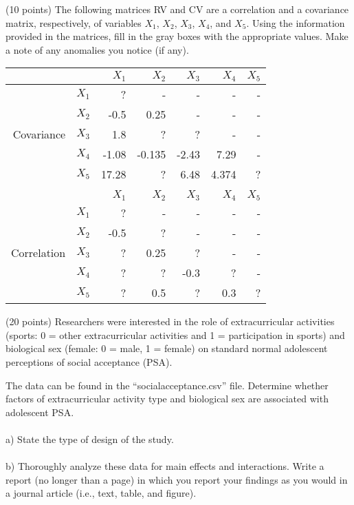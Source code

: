 \documentclass[onecolumn,10pt]{jhwhw}
\begin{document}
\problem{}
(10 points) The following matrices RV and CV are a correlation and a covariance matrix, respectively, of variables $X_1$, $X_2$, $X_3$, $X_4$, and $X_5$. Using the information provided in the matrices, fill in the gray boxes with the appropriate values. Make a note of any anomalies you notice (if any).

\begin{table}[h!]
\begin{center}
\begin{tabular}{rr|rrrrr}
\toprule
  & & $X_1$ & $X_2$ & $X_3$ & $X_4$ & $X_5$ \\
\midrule
            & $X_1$ & ?      & -       & -     & -     & -   \\
            & $X_2$ & -0.5   & 0.25    & -     & -     & -   \\
Covariance  & $X_3$ & 1.8    & ?       & ?     & -     & -   \\
            & $X_4$ & -1.08  & -0.135  & -2.43 & 7.29  & -   \\
            & $X_5$ & 17.28  & ?       &  6.48 & 4.374 & ?   \\
\bottomrule
\\
\toprule
  & & $X_1$ & $X_2$ & $X_3$ & $X_4$ & $X_5$ \\
\midrule
            & $X_1$ & ?      & -       & -     & -     & -   \\
            & $X_2$ & -0.5   & ?       & -     & -     & -   \\
Correlation & $X_3$ & ?      & 0.25    & ?     & -     & -   \\
            & $X_4$ & ?      & ?       & -0.3  & ?     & -   \\
            & $X_5$ & ?      & 0.5     & ?     & 0.3   & ?   \\
\bottomrule
\end{tabular}
\end{center}
\end{table}

\problem{}
(20 points) Researchers were interested in the role of extracurricular activities (sports: 0 = other extracurricular activities and 1 = participation in sports) and biological sex (female: 0 = male, 1 = female) on standard normal adolescent perceptions of social acceptance (PSA).

The data can be found in the “socialacceptance.csv” file. Determine whether factors of extracurricular activity type and biological sex are associated with adolescent PSA.\\
\\
a) State the type of design of the study.\\
\\
b) Thoroughly analyze these data for main effects and interactions. Write a report (no longer than a page) in which you report your findings as you would in a journal article (i.e., text, table, and figure).
\end{document}
